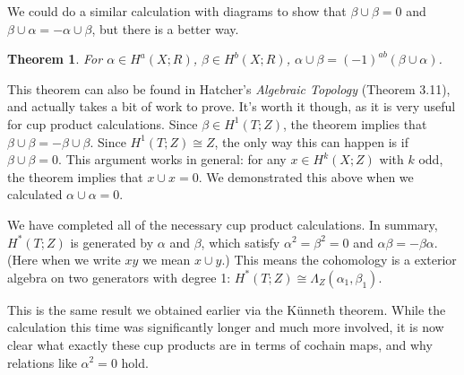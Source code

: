 \documentclass[12pt,a4paper]{article}
\newtheorem{theorem}{Theorem}
\begin{document}
We could do a similar calculation with diagrams to show that $\beta \cup \beta = 0$ and $\beta \cup \alpha = - \alpha \cup \beta$, but there is a better way.

\begin{theorem}
  For $\alpha \in H^a(X;R)$, $\beta \in H^b(X;R)$, $\alpha \cup \beta = (-1)^{ab}(\beta \cup \alpha)$.
\end{theorem}

This theorem can also be found in Hatcher's \emph{Algebraic Topology} (Theorem 3.11), and actually takes a bit of work to prove. It's worth it though, as it is very useful for cup product calculations. Since $\beta \in H^1(T;Z)$, the theorem implies that $\beta \cup \beta = - \beta \cup \beta$. Since $H^1(T;Z) \cong Z$, the only way this can happen is if $\beta \cup \beta = 0$. This argument works in general: for any $x \in H^k(X;Z)$ with $k$ odd, the theorem implies that $x \cup x = 0$. We demonstrated this above when we calculated $\alpha \cup \alpha = 0$.


We have completed all of the necessary cup product calculations. In summary, $H^*(T;Z)$ is generated by $\alpha$ and $\beta$, which satisfy $\alpha^2 = \beta^2 = 0$ and $\alpha \beta = -\beta \alpha$. (Here when we write $xy$ we mean $x \cup y$.) This means the cohomology is a exterior algebra on two generators with degree 1: $H^*(T;Z) \cong \Lambda_Z(\alpha_1, \beta_1)$.

This is the same result we obtained earlier via the K\"unneth theorem. While the calculation this time was significantly longer and much more involved, it is now clear what exactly these cup products are in terms of cochain maps, and why relations like $\alpha^2 = 0$ hold.
\end{document}
